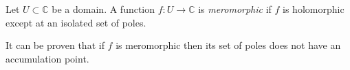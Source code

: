 \documentclass{article}
\begin{document}
Let $U \subset \mathbb{C}$ be a domain. A function $f\colon U \to \mathbb{C}$ is \emph{meromorphic} if $f$ is holomorphic except at an isolated set of poles.

It can be proven that if $f$ is meromorphic then its set of poles does not have an accumulation point.
\end{document}
